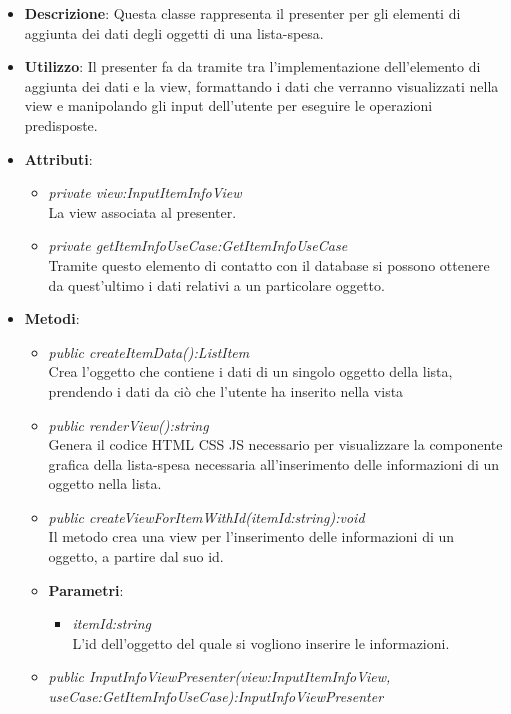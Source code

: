 \begin{itemize}
\item \textbf{Descrizione}: Questa classe rappresenta il presenter per gli elementi di aggiunta dei dati degli oggetti di una lista-spesa.
\item \textbf{Utilizzo}: Il presenter fa da tramite tra l'implementazione dell'elemento di aggiunta dei dati e la view, formattando i dati che verranno visualizzati nella view e manipolando gli input dell'utente per eseguire le operazioni predisposte.
\item \textbf{Attributi}: 
	\begin{itemize}
	\item \textit{private view:InputItemInfoView}\\
	La view associata al presenter.
	\item \textit{private getItemInfoUseCase:GetItemInfoUseCase}\\
	Tramite questo elemento di contatto con il database si possono ottenere da quest'ultimo i dati relativi a un particolare oggetto.
	\end{itemize}
\item \textbf{Metodi}:
	\begin{itemize}
	\item \textit{public createItemData():ListItem}\\
	Crea l'oggetto che contiene i dati di un singolo oggetto della lista, prendendo i dati da ciò che l'utente ha inserito nella vista
	\item \textit{public renderView():string}\\
	Genera il codice HTML CSS JS necessario per visualizzare la componente grafica della lista-spesa necessaria all'inserimento delle informazioni di un oggetto nella lista.
	\item \textit{public createViewForItemWithId(itemId:string):void}\\
	Il metodo crea una view per l'inserimento delle informazioni di un oggetto, a partire dal suo id.
			\item{\textbf{Parametri}: \begin{itemize}
			\item \textit{itemId:string}\\
			L'id dell'oggetto del quale si vogliono inserire le informazioni.
			\end{itemize}}
	\item \textit{public InputInfoViewPresenter(view:InputItemInfoView, useCase:GetItemInfoUseCase):InputInfoViewPresenter}\\

\end{itemize}
\end{itemize}
